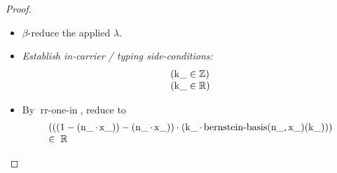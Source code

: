 \documentclass[11pt]{article}
\theoremstyle{plain}
\begin{document}
\begin{proof}
\begin{itemize}[leftmargin=2.8em, itemsep=4pt, parsep=1pt]
  \item[\textbf{42--43}] $\beta$-reduce the applied $\lambda$.
  \item[\textbf{44--45}] \emph{Establish in-carrier / typing side-conditions:}
\begin{equation*}
\begin{array}{@{}l@{}}
(\operatorname{k\_} \in \mathbb{Z}) \\
(\operatorname{k\_} \in \mathbb{R})
\end{array}
\end{equation*}

  \item[\textbf{46}] By $\operatorname{rr\text{-}one\text{-}in}$, reduce to
\begin{equation*}
\begin{array}{@{}l@{}} (((1 - (\operatorname{n\_} \cdot \operatorname{x\_})) - (\operatorname{n\_} \cdot \operatorname{x\_})) \cdot (\operatorname{k\_} \cdot \operatorname{bernstein\text{-}basis}(\operatorname{n\_}, \operatorname{x\_})(\operatorname{k\_}))) \\ \in\; \mathbb{R} \end{array}
\end{equation*}


\end{itemize}
\end{proof}
\end{document}

